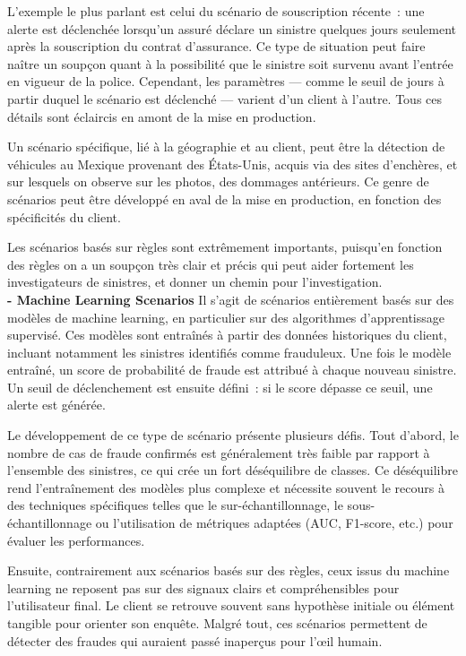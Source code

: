 \documentclass [twoside,openright,a4paper,11pt,french] {report}
\begin{document}
L'exemple le plus parlant est celui du scénario de souscription récente~: une alerte est déclenchée lorsqu'un assuré déclare un sinistre quelques jours seulement 
après la souscription du contrat d'assurance.  
Ce type de situation peut faire naître un soupçon quant à la possibilité que le sinistre soit survenu avant l'entrée en vigueur de la police.  
Cependant, les paramètres — comme le seuil de jours à partir duquel le scénario est déclenché — varient d'un client à l'autre. Tous ces détails 
sont éclaircis en amont de la mise en production. 

Un scénario spécifique, lié à la géographie et au client, peut être la détection de véhicules au Mexique provenant des États-Unis,  
acquis via des sites d'enchères, et sur lesquels on observe sur les photos, des dommages antérieurs.  
Ce genre de scénarios peut être développé en aval de la mise en production, en fonction des spécificités du client. 

Les scénarios basés sur règles sont extrêmement importants, puisqu'en fonction des règles on a un soupçon très clair et précis 
qui peut aider fortement les investigateurs de sinistres, et donner un chemin pour l'investigation. \\


\textbf{- Machine Learning Scenarios}
Il s'agit de scénarios entièrement basés sur des modèles de machine learning, en particulier sur des algorithmes d'apprentissage supervisé.  
Ces modèles sont entraînés à partir des données historiques du client, incluant notamment les sinistres identifiés comme frauduleux.  
Une fois le modèle entraîné, un score de probabilité de fraude est attribué à chaque nouveau sinistre.  
Un seuil de déclenchement est ensuite défini~: si le score dépasse ce seuil, une alerte est générée.

Le développement de ce type de scénario présente plusieurs défis.  
Tout d'abord, le nombre de cas de fraude confirmés est généralement très faible par rapport à l'ensemble des sinistres,  
ce qui crée un fort déséquilibre de classes. Ce déséquilibre rend l'entraînement des modèles plus complexe et nécessite souvent  
le recours à des techniques spécifiques telles que le sur-échantillonnage, le sous-échantillonnage ou l'utilisation de métriques adaptées  
(AUC, F1-score, etc.) pour évaluer les performances.

Ensuite, contrairement aux scénarios basés sur des règles, ceux issus du machine learning ne reposent pas sur des signaux clairs et compréhensibles pour l'utilisateur final.  
Le client se retrouve souvent sans hypothèse initiale ou élément tangible pour orienter son enquête.  
Malgré tout, ces scénarios permettent de détecter des fraudes qui auraient passé inaperçus pour l'œil humain. 
\end{document}

